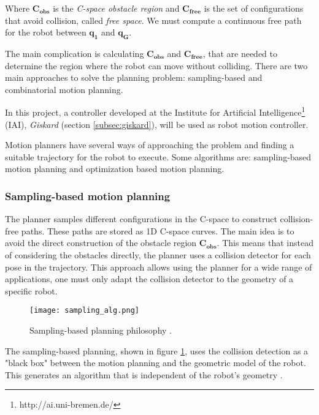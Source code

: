 Where $\bm{C_{obs}}$ is the \textit{C-space obstacle region} and $\bm{C_{free}}$ is the set of configurations that avoid collision, called \textit{free space}. We must compute a continuous free path for the robot between $\bm{q_{1}}$ and $\bm{q_{G}}$.

The main complication is calculating $\bm{C_{obs}}$ and $\bm{C_{free}}$, that are needed to determine the region where the robot can move without colliding. There are two main approaches to solve the planning problem: sampling-based and combinatorial motion planning.

In this project, a controller developed at the Institute for Artificial Intelligence\footnote{http://ai.uni-bremen.de/} (IAI), \textit{Giskard} (section \ref{subsec:giskard}), will be used as robot motion controller.

Motion planners have several ways of approaching the problem and finding a suitable trajectory for the robot to execute. Some algorithms are: sampling-based motion planning and optimization based motion planning.

\subsubsection{Sampling-based motion planning}
\label{subsec:planning}

The planner samples different configurations in the C-space to construct collision-free paths. These paths are stored as 1D C-space curves. The main idea is to avoid the direct construction of the obstacle region $\bm{C_{obs}}$. This means that instead of considering the obstacles directly, the planner uses a collision detector for each pose in the trajectory. This approach allows using the planner for a wide range of applications, one must only adapt the collision detector to the geometry of a specific robot.
\begin{figure}[H]
	\centering
	\texttt{[image: sampling\_alg.png]}
	\vspace{-10pt}
	\caption{Sampling-based planning philosophy \citep[chap. 5, page 185]{planning}.}
	\vspace{-15pt}
	\label{fig:sampling}
\end{figure}

The sampling-based planning, shown in figure \ref{fig:sampling}, uses the collision detection as a "black box" between the motion planning and the geometric model of the robot. This generates an algorithm that is independent of the robot's geometry \citep{planning} .

